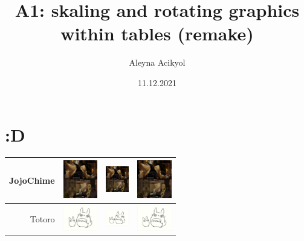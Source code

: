 \documentclass[12pt,fleqn]{article}
\title{A1: skaling and rotating graphics within tables (remake)}
\author{Aleyna Acikyol}
\date{11.12.2021}
\begin{document}
\maketitle
\section*{:D}

\begin{tabular}{r|c|c|c}

JojoChime 
	& \includegraphics[width=15mm]{jojo_chime.eps} 
	& \includegraphics[width=10mm]{jojo_chime.eps} 
	& \includegraphics[width=15mm, angle=40]{jojo_chime.eps} \\

\hline

Totoro	
	& \includegraphics[width=15mm]{totoro.eps} 
	& \includegraphics[width=10mm]{totoro.eps} 
	& \includegraphics[width=15mm, angle=70]{totoro.eps} \\

\end{tabular}
\end{document}
